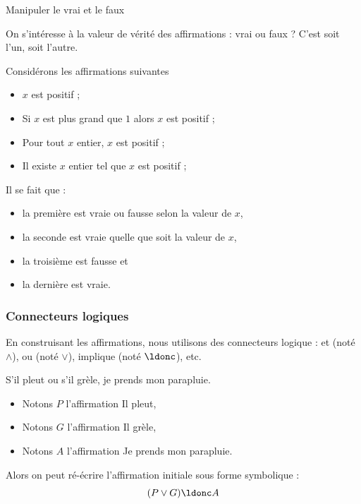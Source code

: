 \begin{frame}{Manipuler le vrai et le faux}
  \begin{definition}
    On s'intéresse à la valeur de vérité des affirmations : vrai ou faux ? C'est soit l'un, soit l'autre.
  \end{definition}

  \begin{example}
    Considérons les affirmations suivantes
    \begin{itemize}
    \item \og $x$ est positif\fg{} ;
    \item \og Si \(x\) est plus grand que \(1\) alors \(x\) est positif\fg{} ;
    \item \og Pour tout $x$ entier, $x$ est positif\fg{} ;
    \item \og Il existe $x$ entier tel que $x$ est positif\fg{} ;
    \end{itemize}
  \end{example}
\end{frame}
\begin{frame}
  \begin{example}
    Il se fait que :
    \begin{itemize}
    \item la première est vraie ou fausse selon la valeur de $x$,
    \item la seconde est vraie quelle que soit la valeur de \(x\),
    \item la troisième est fausse et
    \item la dernière est vraie.
    \end{itemize}
  \end{example}
\end{frame}

\begin{frame}
  \frametitle{Connecteurs logiques}
  En construisant les affirmations, nous utilisons des connecteurs logique : \og et\fg{} (noté \(\land\)), \og ou\fg{} (noté \(\lor\)), \og implique\fg{} (noté \(\ldonc\)), etc.

  \begin{example}
    S'il pleut ou s'il grèle, je prends mon parapluie.\pause

    \begin{itemize}
    \item Notons \(P\) l'affirmation \og Il pleut\fg{},
    \item Notons \(G\) l'affirmation \og Il grèle\fg{},
    \item Notons \(A\) l'affirmation \og Je prends mon parapluie\fg{}.
    \end{itemize}
    Alors on peut ré-écrire l'affirmation initiale sous forme symbolique :
    \begin{equation*}
      (P \lor G) \ldonc A
    \end{equation*}
  \end{example}
\end{frame}

